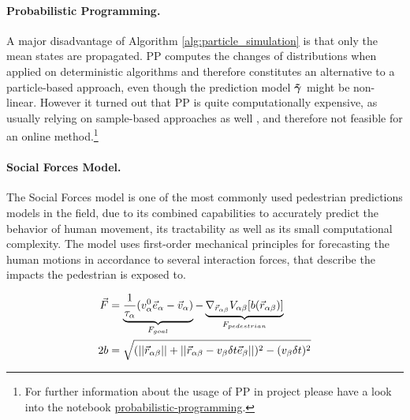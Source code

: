 \paragraph{Probabilistic Programming.} A major disadvantage of Algorithm \ref{alg:particle_simulation} is that only the mean states are propagated. \ac{PP} computes the changes of distributions when applied on deterministic algorithms and therefore constitutes an alternative to a particle-based approach, even though the prediction model $\distmodeldet[]$ might be non-linear. However it turned out that \ac{PP} is quite computationally expensive, as usually relying on sample-based approaches as well \cite{Jensen2007}, and therefore not feasible for an online method.\footnote{For further information about the usage of \ac{PP} in project \project please have a look into the notebook \href{https://github.com/simon-schaefer/mantrap/blob/master/examples/tools/probabilistic_programming.ipynb}{probabilistic-programming}.} 

\paragraph{Social Forces Model.} The Social Forces model \cite{Helbing1995} is one of the most commonly used pedestrian predictions models in the field, due to its combined capabilities to accurately predict the behavior of human movement, its tractability as well as its small computational complexity. The model uses first-order mechanical principles for forecasting the human motions in accordance to several interaction forces, that describe the impacts the pedestrian is exposed to. 

\begin{align}
\vec{F} &= \underbrace{\frac{1}{\tau_{\alpha}} (v^0_{\alpha} \vec{e}_{\alpha} - \vec{v}_{\alpha})}_{F_{goal}} - \underbrace{\nabla_{\vec{r}_{\alpha \beta}} V_{\alpha \beta}[b(\vec{r}_{\alpha \beta})]}_{F_{pedestrian}} 
\label{eq:social_forces} \\
2b &= \sqrt{(||\vec{r}_{\alpha \beta}|| + ||\vec{r}_{\alpha \beta} - v_{\beta} \delta t \vec{e}_{\beta}||)^2 - (v_{\beta} \delta t)^2}
\end{align}

